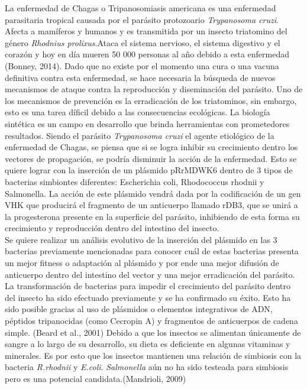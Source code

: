 \documentclass[12pt]{article}
\numberwithin{equation}{section}
\begin{document}
La enfermedad de Chagas o Tripanosomiasis americana es una enfermedad parasitaria tropical causada por el parásito protozoario \textit{Trypanosoma cruzi}. Afecta a mamíferos y humanos y es transmitida por un insecto triatomino del género \textit{Rhodnius prolixus}.Ataca el sistema nervioso, el sistema digestivo y el corazón y hoy en día mueren 50 000 personas al año debido a esta enfermedad (Bonney, 2014). Dado que no existe por el momento una cura o una vacuna definitiva contra esta enfermedad, se hace necesaria la búsqueda de nuevos mecanismos de ataque contra la reproducción y diseminación del parásito. Uno de los mecanismos de prevención es la erradicación de los triatominos, sin embargo, esto es una tarea díficil debido a las consecuencias ecológicas.  
La biología sintética es un campo en desarrollo que brinda herramientas con prometedores resultados. Siendo el parásito \textit{Trypanosoma cruzi} el agente etiológico de la enfermedad de Chagas, se piensa que si se logra inhibir su crecimiento dentro los vectores de propagación, se podría disminuir la acción de la enfermedad. Esto se quiere lograr con la inserción de un plásmido pRrMDWK6 dentro de 3 tipos de bacterias simbiontes diferentes: Escherichia coli, Rhodococcus rhodnii y Salmonella. La acción de este plásmido vendrá dada por la codificación de un gen VHK que producirá el fragmento de un anticuerpo llamado rDB3, que se unirá a la progesterona presente en la superficie del parásito, inhibiendo de esta forma su crecimiento y reproducción dentro del intestino del insecto. \\
Se quiere realizar un análisis evolutivo de la inserción del plásmido en las 3 bacterias previamente mencionadas para conocer cuál de estas bacterias presenta un mejor fitness o adaptación al plásmido y por ende una mejor difusión de anticuerpo dentro del intestino del vector y una mejor erradicación del parásito.
La transformación de bacterias para impedir el crecimiento del parásito dentro del insecto ha sido efectuado previamente y se ha confirmado su éxito. Esto ha sido posible gracias al uso de plásmidos o elementos integrativos de ADN, péptidos tripanocidas (como Cecropin A) y fragmentos de anticuerpos de cadena simple. (Beard et al., 2001)
Debido a que los insectos se alimentan únicamente de sangre a lo largo de su desarrollo, su dieta es deficiente en algunas vitaminas y minerales. Es por esto que los insectos mantienen una relación de simbiosis con la bacteria \textit{R.rhodnii} y \textit{E.coli}. \textit{Salmonella} aún no ha sido testeada para simbiosis pero es una potencial candidata.(Mandrioli, 2009) \\
\end{document}
